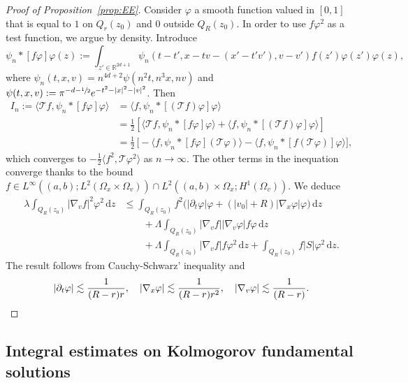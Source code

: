 \documentclass[JEP,XML,SOM,Unicode,NoFloatCountersInSection,published]{cedram}
\let\mathcal\mathscr
\theoremstyle{definition}
\theoremstyle{remark}
\newcommand\R{{\mathbb R}}
\newcommand{\cT}{\mathcal T}
\newcommand{\dd}{{\, \mathrm d}}
\begin{document}
\begin{proof}[Proof of Proposition~\ref{prop:EE}]
Consider $\varphi$ a smooth function valued in $[0,1]$ that is
equal to $1$ on $Q_r(z_0)$ and $0$ outside $Q_R(z_0)$. In order
to use $f\varphi^2$ as a test function, we argue by
density. Introduce
\begin{equation*}
\psi_n * [f \varphi] \varphi (z) :=
\int_{z'\in\R^{2d+1}} \psi_n \left(t-t',x-tv-(x'-t'v'),v-v'
\right) f(z') \varphi(z') \varphi(z),
\end{equation*}
where $\psi_n(t,x,v)=n^{4d+2} \psi(n^2 t,n^3 x, n v)$ and
$\psi(t,x,v):= \pi^{-d-\sfrac{1}{2}} e^{-t^2-|x|^2-|v|^2}$.
Then
\begin{align*}
I_n:= \big\langle \cT f, \psi_n * [f \varphi] \varphi
\big\rangle
& = \big\langle f, \psi_n * [(\cT f) \varphi] \varphi
\big\rangle \\
& = \frac{1}{2} \left[\big\langle \cT f, \psi_n * [f \varphi] \varphi
\big\rangle + \big\langle f, \psi_n * [(\cT f) \varphi] \varphi
\big\rangle \right] \\
& = \frac{1}{2}\, \bigl[-\big\langle f, \psi_n * [f \varphi] (\cT\varphi)
\big\rangle -\big\langle f, \psi_n * [f (\cT \varphi)] \varphi
\big\rangle \bigr],
\end{align*}
which converges to
$-\frac{1}{2} \big\langle f^2, \cT\varphi^2 \big\rangle$ as $n
\to \infty$. The
other terms in the inequation converge thanks to the bound
$f \in L^\infty ((a,b);L^2 (\Omega_x \times \Omega_v)) \cap L^2
((a,b) \times \Omega_x;H^1(\Omega_v))$. We deduce
\begin{align*}
\lambda \int_{Q_R(z_0)} |\nabla_v f|^2
\varphi^2 \dd z
& \le \int_{Q_R(z_0)} f^2 \Big( |\partial_t \varphi|
\varphi + (|v_0|+R) | \nabla_x \varphi| \varphi \Big) \dd z\\
& \qquad + \Lambda \int_{Q_R(z_0)} |\nabla_v
f| |\nabla_v \varphi| f \varphi \dd z \\
& \qquad + \Lambda
\int_{Q_R(z_0)} |\nabla_v f| f \varphi^2 \dd z +
\int_{Q_R(z_0)} f |S| \varphi^2 \dd z.
\end{align*}
The result follows from Cauchy-Schwarz' inequality
and
\[
|\partial_t \varphi| \lesssim \frac{1}{(R-r)r},\quad
|\nabla_x \varphi| \lesssim \frac{1}{(R-r)r^2},\quad
|\nabla_v \varphi| \lesssim \frac{1}{(R-r)}.\qedhere
\]
\end{proof}

\subsection{Integral estimates on Kolmogorov fundamental
solutions}
\end{document}
